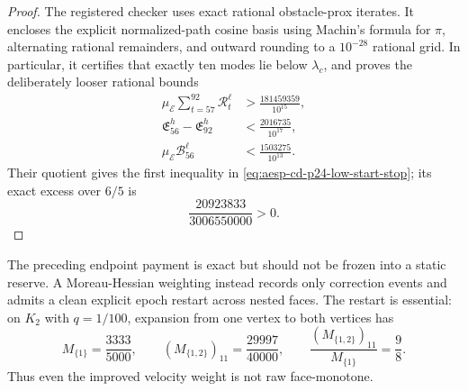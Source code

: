 \begin{proof}
The registered checker uses exact rational obstacle-prox iterates.  It encloses
the explicit normalized-path cosine basis using Machin's formula for $\pi$,
alternating rational remainders, and outward rounding to a $10^{-28}$ rational
grid.  In particular, it certifies that exactly ten modes lie below
$\lambda_c$, and proves the deliberately looser rational bounds
\begin{align*}
 \mu_{\mathcal E}\sum_{t=57}^{92}\mathcal R_t^\ell
 &>\frac{181459359}{10^{15}},\\
 \mathfrak E_{56}^h-\mathfrak E_{92}^h
 &<\frac{2016735}{10^{17}},\\
 \mu_{\mathcal E}\mathcal B_{56}^\ell
 &<\frac{1503275}{10^{13}}.
\end{align*}
Their quotient gives the first inequality in
\cref{eq:aesp-cd-p24-low-start-stop}; its exact excess over $6/5$ is
\begin{equation*}
 \frac{20923833}{3006550000}>0.
\end{equation*}
\end{proof}

The preceding endpoint payment is exact but should not be frozen into a
static reserve.  A Moreau-Hessian weighting instead records only correction
events and admits a clean explicit epoch restart across nested faces.  The
restart is essential: on $K_2$ with $q=1/100$, expansion from one vertex to
both vertices has
\begin{equation*}
 M_{\{1\}}=\frac{3333}{5000},
 \qquad (M_{\{1,2\}})_{11}=\frac{29997}{40000},
 \qquad
 \frac{(M_{\{1,2\}})_{11}}{M_{\{1\}}}=\frac98.
\end{equation*}
Thus even the improved velocity weight is not raw face-monotone.

